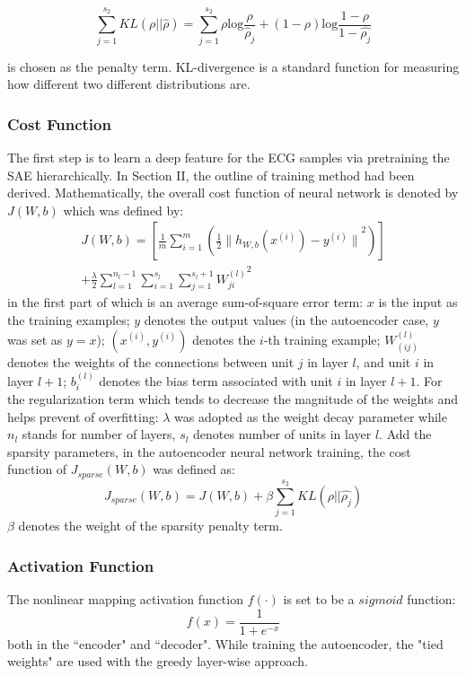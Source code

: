 \documentclass[journal]{IEEEtran}
\begin{document}
\begin{equation}
 \sum_{j=1}^{s_2}KL(\rho||\hat{\rho}) =  \sum_{j=1}^{s_2}\rho \text{log}{\frac{\rho}{\hat{\rho}_j}}+(1-\rho)\text{log}\frac{1-\rho}{1-\hat{{\rho}_j}}
\end{equation}

\noindent is chosen as the  penalty term. KL-divergence is a standard function for measuring how different two different distributions are. 
\subsubsection{Cost Function}
The first step is to learn a deep feature for the ECG samples via pretraining the SAE hierarchically. In Section II, the outline of training method had been derived. Mathematically, the overall cost function of neural network is denoted by $J(W, b)$ which was defined by:
\begin{equation}
\begin{split}
J(W,b) = [\frac{1}{m}\sum_{i=1}^m(\frac{1}{2}{\|{h_{W,b}(x^{(i)})} - y^{(i)}\|}^2)] \\
+ \frac{\lambda}{2}\sum_{l=1}^{n_l-1} \sum_{i=1}^{s_l} \sum_{j=1}^{s_l+1}{W_{ji}^{(l)}}^2
\end{split}
\end{equation}
in the first part of which is an average sum-of-square error term: $x$ is the input as the training examples; $y$ denotes the output values (in the autoencoder case, $y$ was set as $y=x$); $(x^{(i)}, y^{(i)})$ denotes the $i$-th training example; $W^{(l)}_{(ij)}$ denotes the weights of the connections between unit $j$ in layer $l$, and unit $i$ in layer $l+1$; $b_i^{(l)}$ denotes the bias term associated with unit $i$ in layer $l+1$. For the regularization term which tends to decrease the magnitude of the weights and helps prevent of overfitting: $\lambda$ was adopted as the weight decay parameter while $n_l$ stands for number of layers, $s_l$ denotes number of units in layer $l$.
Add the sparsity parameters, in the autoencoder neural network training, the cost function of $J_{sparse}(W,b)$ was defined as:
\begin{equation}
J_{sparse}(W,b) = J(W,b) + \beta \sum_{j=1}^{s_2}KL(\rho||\hat{\rho_j})
\end{equation}
\noindent $\beta$ denotes the weight of the sparsity penalty term. 


\subsubsection{Activation Function}
The nonlinear mapping activation function $f(\cdot)$ is set to be a $sigmoid$ function:
\begin{equation}
f(x) = \frac{1}{1+e^{-x}}
\end{equation}
both in the ``encoder" and ``decoder". While training the autoencoder, the "tied weights" are used with the greedy layer-wise approach. 
\end{document}
